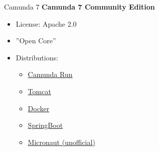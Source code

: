 \documentclass[12pt,aspectratio=169]{beamer}
\begin{document}
\begin{frame}{Camunda 7}
\textbf{Camunda 7 Community Edition}
\par
\vspace{0.5cm}
\par
\begin{minipage}{0.5\textwidth}
\begin{itemize}
    \item License: Apache 2.0
    \item ''Open Core''
    \item Distributions:
\begin{itemize}
    \item \href{https://camunda.com/download/platform-7/}{Camunda Run}
    \item \href{https://camunda.com/download/platform-7/}{Tomcat}
    \item \href{https://hub.docker.com/r/camunda/camunda-bpm-platform}{Docker}
    \item \href{https://start.camunda.com/}{SpringBoot}
    \item \href{https://github.com/camunda-community-hub/micronaut-camunda-platform-7}{Micronaut (unofficial)}
\end{itemize}
\end{itemize}
\end{minipage}
\begin{minipage}{0.45\textwidth}
\end{minipage}
\end{frame}
\end{document}
